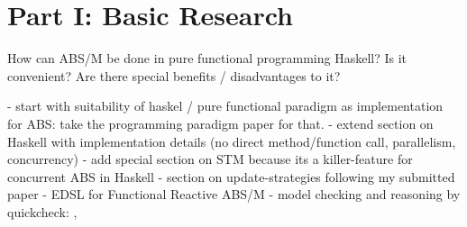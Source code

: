 \section{Part I: Basic Research}
How can ABS/M be done in pure functional programming Haskell? Is it convenient? Are there special benefits / disadvantages to it? 

- start with suitability of haskel / pure functional paradigm as implementation for ABS: take the programming paradigm paper for that.
- extend section on Haskell with implementation details (no direct method/function call, parallelism, concurrency)
- add special section on STM because its a killer-feature for concurrent ABS in Haskell
- section on update-strategies following my submitted paper
- EDSL for Functional Reactive ABS/M
- model checking and reasoning by quickcheck: \cite{claessen_quickcheck:_2000}, \cite{hutton_tutorial_1999}